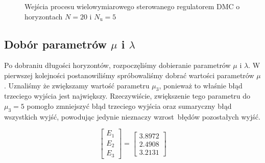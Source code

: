 \begin{figure}
    \begin{subfigure}[b]{\textwidth}
        \centering
    \end{subfigure}
    \caption{Wejścia procesu wielowymiarowego sterowanego regulatorem DMC o horyzontach $N = \num{20}$ i
    $N_{\mathrm{u}} = \num{5}$}
    \label{pro_dmc_2_in}
\end{figure}
\FloatBarrier


\subsection{Dobór parametrów $\mu$ i $\lambda$}
\label{pro_dmc_strojenie_mu_lambda}

Po dobraniu długości horyzontów, rozpoczęliśmy dobieranie parametrów $\mu$ i $\lambda$.
W pierwszej kolejności postanowiliśmy spróbowaliśmy dobrać wartości parametrów $\mu$. Uznaliśmy że 
zwiększamy wartość parametru $\mu_{3}$, ponieważ to właśnie błąd trzeciego wyjścia jest największy.
Rzeczywiście, zwiększenie tego parametru do $\mu_{3} = \num{5}$ pomogło zmniejszyć błąd trzeciego wyjścia oraz
sumaryczny błąd wszystkich wyjść, powodując jedynie nieznaczy wzrost błędów pozostałych wyjść.


\[
\begin{bmatrix}
    E_{\mathrm{1}} \\
    E_{\mathrm{2}} \\
    E_{\mathrm{3}} 
\end{bmatrix}
= 
\begin{bmatrix}
    \num{3.8972} \\
    \num{2.4908} \\
    \num{3.2131}
\end{bmatrix}
\]

